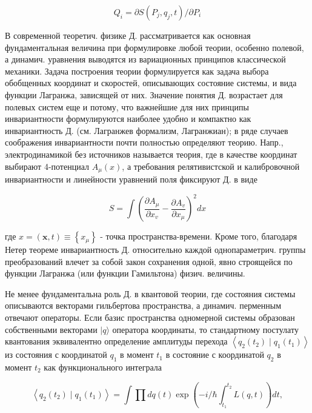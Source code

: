 \documentclass[10pt]{article}
\begin{document}
\[

Q_{i}=\partial S\left(P_{j}, q_{j}, t\right) / \partial P_{i}

\]



В современной теоретич. физике Д. рассматривается как основная фундаментальная величина при формулировке любой теории, особенно полевой, а динамич. уравнения выводятся из вариационных принципов классической механики. Задача построения теории формулируется как задача выбора обобщенных координат и скоростей, описывающих состояние системы, и вида функции Лагранжа, зависящей от них. Значение понятия Д. возрастает для полевых систем еще и потому, что важнейшие для них принципы инвариантности формулируются наиболее удобно и компактно как инвариантность Д. (см. Лагранжев формализм, Лагранжиан); в ряде случаев соображения инвариантности почти полностью определяют теорию. Напр., электродинамикой без источников называется теория, где в качестве координат выбирают 4-потенциал $A_{\mu}(x)$, а требования релятивистской и калибровочной инвариантности и линейности уравнений поля фиксируют Д. в виде



\[

S=\int\left(\frac{\partial A_{\mu}}{\partial x_{v}}-\frac{\partial A_{v}}{\partial x_{\mu}}\right)^{2} d x

\]



где $x=(\boldsymbol{x}, t) \equiv\left\{x_{\mu}\right\}$ - точка пространства-времени. Кроме того, благодаря Нетер теореме инвариантность Д. относительно каждой однопараметрич. группы преобразований влечет за собой закон сохранения одной, явно строящейся по функции Лагранжа (или функции Гамильтона) физич. величины.



Не менее фундаментальна роль Д. в квантовой теории, где состояния системы описываются векторами гильбертова пространства, а динамич. перменным отвечают операторы. Если базис пространства одномерной системы образован собственными векторами $|q\rangle$ оператора координаты, то стандартному постулату квантования эквивалентно определение амплитуды перехода $\left\langle q_{2}\left(t_{2}\right) \mid q_{1}\left(t_{1}\right)\right\rangle$ из состояния с координатой $q_{1}$ в момент $t_{1}$ в состояние с координатой $q_{2}$ в момент $t_{2}$ как функционального интеграла



\[

\left\langle q_{2}\left(t_{2}\right) \mid q_{1}\left(t_{1}\right)\right\rangle=\int \prod d q(t) \exp \left(-i / \hbar \int_{t_{1}}^{t_{2}} L(q, t)\right) d t,

\]
\end{document}

